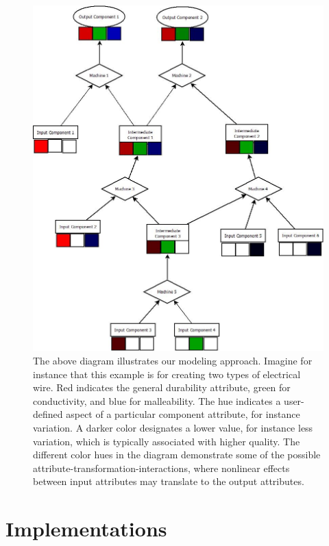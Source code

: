 \documentclass{IEEEtran}
\begin{document}
\begin{figure}[!t]
\centerline{\includegraphics[width=\columnwidth]{Diagram1.jpeg}}
\caption{The above diagram illustrates our modeling approach. Imagine for instance that this example is for creating two types of electrical wire. Red indicates the general durability attribute, green for conductivity, and blue for malleability. The hue indicates a user-defined aspect of a particular component attribute, for instance variation. A darker color designates a lower value, for instance less variation, which is typically associated with higher quality. The different color hues in the diagram demonstrate some of the possible attribute-transformation-interactions, where nonlinear effects between input attributes may translate to the output attributes.}
\label{fig1}
\end{figure}
\section{Implementations}
\end{document}
